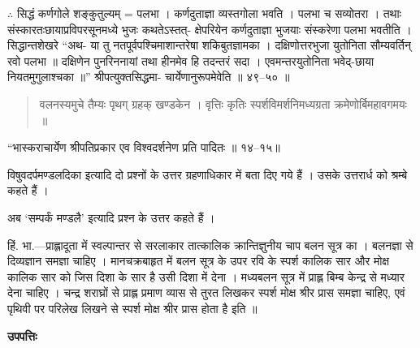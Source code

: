 \documentclass[11pt,a4paper]{article}
\newcommand{\dev}[1]{{\devanagarifont #1}}
\newenvironment{shloka}{\begin{quote}\devanagarifont}{\end{quote}}
\newenvironment{hindicom}{\devanagarifont}{\par}
\begin{document}
\vspace{0.3cm}
\begin{hindicom}
\dev{$\therefore$ सिद्धं कर्णगोले शङ्कुतुल्यम् = पलभा । कर्णदुताज्ञा व्यस्तगोला भवति ।}
\dev{पलभा च सव्योतरा । तथाः संस्कारतःछायाप्रविपरसूनमध्ये भुजः कथतेऽस्तत्-}
\dev{क्षेपरियेन कर्णदुताज्ञा भुजयाः संस्करेणा पलभा भवतीति । सिद्धान्तशेखरे ``अथ-}
\dev{या तु नतपूर्वपश्चिमाशान्तरेषा शकिबुतज्ञामका । दक्षिणोत्तरभुजा युतोनिता}
\dev{सौम्यवर्तिन् रवो पलभा ॥ दक्षिणेन पुनरिननायां तथा हीनमेव हि तदन्तरं}
\dev{सदा । एवमन्तरयुतोनिता भवेद्-छाया नियतमुगुलाश्चका ॥'' श्रीपत्युक्तसिद्धमा-}
\dev{चार्येणानुरूपमेवेति ॥ ४९--५० ॥}
\end{hindicom}

\vspace{0.5cm}
\begin{shloka}
\dev{वलनस्यमुचे तैम्यः पृथग् ग्रहक् खण्डकेन । वृत्तिः कृतिः स्पर्शविमर्शनिमध्यग्रता}
\dev{क्रमेणोर्बिमहावगमयः ॥}
\end{shloka}

\begin{hindicom}
\dev{``भास्कराचार्येण श्रीपतिप्रकार एव विश्वदर्शनेण प्रति}
\dev{पादितः ॥ १४--१५॥}
\end{hindicom}

\vspace{0.5cm}
\begin{hindicom}
\dev{विषुवदर्पमण्डलदिका इत्यादि दो प्रश्नों के उत्तर ग्रहणाधिकार में बता दिए}
\dev{गये हैं । उसके उत्तरार्ध को श्रम्बे कहते हैं ।}

\dev{अब `सम्पर्कं मण्डलै' इत्यादि प्रश्न के उत्तर कहते हैं ।}

\dev{हिं. भा.---प्राह्लादूता में स्वल्पान्तर से सरलाकार तात्कालिक क्रान्तिज्ञुनीय चाप}
\dev{बलन सूत्र का । बलनज्ञा से दिव्यज्ञान समज्ञा चाहिए । मानचक्रबाहृत में बलन सूत्र के}
\dev{उपर रवि के स्पर्श कालिक सार और मोक्ष कालिक सार को जिस दिशा के सार है उसी दिशा}
\dev{में देना । मध्यबलन सूत्र में प्राह्ल बिम्ब केन्द्र से मध्यार देना चाहिए । चन्द्र शराघ्रों से प्राह्ल}
\dev{प्रमाण व्यास से तुरत लिखकर स्पर्श मोक्ष श्रीर प्रास समज्ञा चाहिए, एवं पृथिवी पर परिलेख}
\dev{लिखने से स्पर्श मोक्ष श्रीर प्रास होता है इति ॥}
\end{hindicom}

\vspace{0.5cm}
\noindent\textbf{\dev{उपपत्तिः}}
\end{document}
